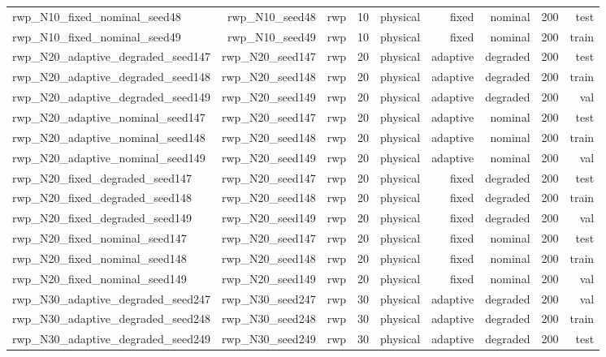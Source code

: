 \begin{tabular}{lrrrrrrrr}
rwp\_N10\_fixed\_nominal\_seed48 & rwp\_N10\_seed48 & rwp & 10 & physical & fixed & nominal & 200 & test \\
rwp\_N10\_fixed\_nominal\_seed49 & rwp\_N10\_seed49 & rwp & 10 & physical & fixed & nominal & 200 & train \\
rwp\_N20\_adaptive\_degraded\_seed147 & rwp\_N20\_seed147 & rwp & 20 & physical & adaptive & degraded & 200 & test \\
rwp\_N20\_adaptive\_degraded\_seed148 & rwp\_N20\_seed148 & rwp & 20 & physical & adaptive & degraded & 200 & train \\
rwp\_N20\_adaptive\_degraded\_seed149 & rwp\_N20\_seed149 & rwp & 20 & physical & adaptive & degraded & 200 & val \\
rwp\_N20\_adaptive\_nominal\_seed147 & rwp\_N20\_seed147 & rwp & 20 & physical & adaptive & nominal & 200 & test \\
rwp\_N20\_adaptive\_nominal\_seed148 & rwp\_N20\_seed148 & rwp & 20 & physical & adaptive & nominal & 200 & train \\
rwp\_N20\_adaptive\_nominal\_seed149 & rwp\_N20\_seed149 & rwp & 20 & physical & adaptive & nominal & 200 & val \\
rwp\_N20\_fixed\_degraded\_seed147 & rwp\_N20\_seed147 & rwp & 20 & physical & fixed & degraded & 200 & test \\
rwp\_N20\_fixed\_degraded\_seed148 & rwp\_N20\_seed148 & rwp & 20 & physical & fixed & degraded & 200 & train \\
rwp\_N20\_fixed\_degraded\_seed149 & rwp\_N20\_seed149 & rwp & 20 & physical & fixed & degraded & 200 & val \\
rwp\_N20\_fixed\_nominal\_seed147 & rwp\_N20\_seed147 & rwp & 20 & physical & fixed & nominal & 200 & test \\
rwp\_N20\_fixed\_nominal\_seed148 & rwp\_N20\_seed148 & rwp & 20 & physical & fixed & nominal & 200 & train \\
rwp\_N20\_fixed\_nominal\_seed149 & rwp\_N20\_seed149 & rwp & 20 & physical & fixed & nominal & 200 & val \\
rwp\_N30\_adaptive\_degraded\_seed247 & rwp\_N30\_seed247 & rwp & 30 & physical & adaptive & degraded & 200 & val \\
rwp\_N30\_adaptive\_degraded\_seed248 & rwp\_N30\_seed248 & rwp & 30 & physical & adaptive & degraded & 200 & train \\
rwp\_N30\_adaptive\_degraded\_seed249 & rwp\_N30\_seed249 & rwp & 30 & physical & adaptive & degraded & 200 & test \\

\end{tabular}
